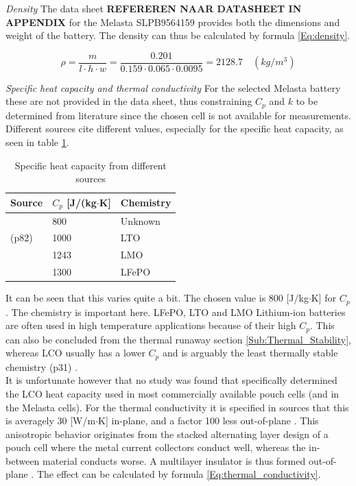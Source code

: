 \textit{Density}\newline
The data sheet \textbf{REFEREREN NAAR DATASHEET IN APPENDIX} for the Melasta SLPB9564159 provides both the dimensions and weight of the battery. The density can thus be calculated by formula \ref{Eq:density}.

\begin{equation}
\label{Eq:density}
\rho = \frac{m}{l\cdot h \cdot w} = \frac{0.201}{0.159\cdot 0.065 \cdot 0.0095} = 2128.7 \quad (kg/m^3)
\end{equation}

\textit{Specific heat capacity and thermal conductivity}\newline
For the selected Melasta battery these are not provided in the data sheet, thus  constraining $C_p$ and $k$ to be determined from literature since the chosen cell is not available for measurements. Different sources cite different values, especially for the specific heat capacity, as seen in table \ref{Table:Specific_heat_thermal_conductivity}. 

\begin{table}[H]
\centering
\caption{Specific heat capacity from different sources}
\label{Table:Specific_heat_thermal_conductivity}
\begin{tabular}{|l|l|l|}
\hline
Source & $C_p$ [J/(kg$\cdot$K] & Chemistry                    \\ \hline \hline
\cite{Ahmad}       & 800   & Unknown                     \\
\cite{Kirill_Murashko}(p82)       & 1000   & LTO               	  \\
\cite{W.}       & 1243   & LMO               	  \\
\cite{Nur}       & 1300   & LFePO               	  \\
\hline   
\end{tabular}
\end{table}

It can be seen that this varies quite a bit. The chosen value is 800 [J/kg$\cdot$K] for $C_p$. The chemistry is important here. LFePO, LTO and LMO Lithium-ion batteries are often used in high temperature applications because of their high $C_p$. This can also be concluded from the thermal runaway section \ref{Sub:Thermal_Stability}, whereas LCO usually has a lower $C_p$ and is arguably the least thermally stable chemistry \cite{Kirill_Murashko}(p31) \cite{types_of_batteries}.\\ It is unfortunate however that no study was found that specifically determined the LCO heat capacity used in most commercially available pouch cells (and in the Melasta cells). \newline
For the thermal conductivity it is specified in sources that this is averagely 30 [W/m$\cdot$K] in-plane, and a factor 100 less out-of-plane \cite{Kirill_Murashko}\cite{W.}. This anisotropic behavior originates from the stacked alternating layer design of a pouch cell where the metal current collectors conduct well, whereas the in-between material conducts worse. A multilayer insulator is thus formed out-of-plane \cite{MLI}. The effect can be calculated by formula \ref{Eq:thermal_conductivity}.

